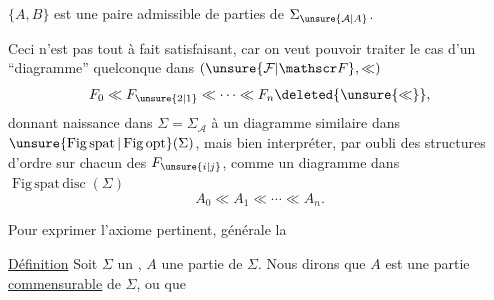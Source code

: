 
 $\{A,B\}$ est une paire admissible de parties de $\Sigma_{\unsure{\mathcal A|A}}$.

Ceci n'est pas tout à fait satisfaisant, car on veut pouvoir traiter le cas d'un ``diagramme'' quelconque dans $(\unsure{\mathcal F|\mathscr F},\ll)$
\[
F_0\ll F_{\unsure{2|1}}\ll\cdots\ll F_n\deleted{\unsure{\ll}},
\]
donnant naissance dans $\Sigma=\Sigma_{\mathcal A}$ à un diagramme similaire dans $\unsure{\operatorname{Fig\,spat}|\operatorname{Fig\,opt}}(\Sigma)$, mais   bien interpréter, par oubli des structures d'ordre  sur  chacun des $F_{\unsure{i|j}}$, comme un diagramme dans $\operatorname{Fig\,spat\,disc}(\Sigma)$
\[
A_0\ll A_1\ll\cdots\ll A_n.
\]

Pour exprimer l'axiome pertinent,  générale la

\uline{Définition} Soit $\Sigma$ un ,  $A$ une partie de $\Sigma$. Nous dirons que $A$ est une partie \uline{commensurable} de $\Sigma$, ou que 
